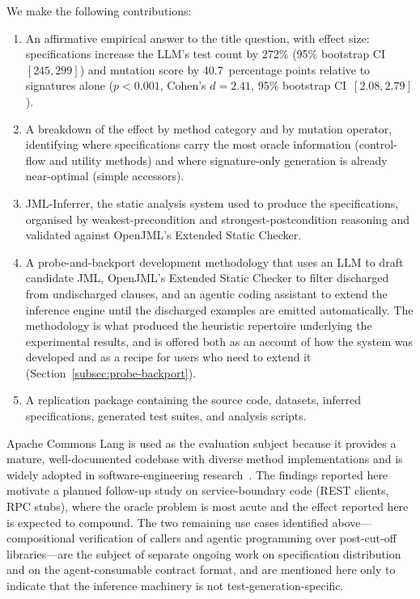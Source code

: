We make the following contributions:

\begin{enumerate}
    \item An affirmative empirical answer to the title question, with effect size: specifications increase the LLM's test count by 272\% (95\% bootstrap CI~$[245, 299]$) and mutation score by 40.7~percentage points relative to signatures alone ($p < 0.001$, Cohen's $d = 2.41$, 95\% bootstrap CI~$[2.08, 2.79]$).

    \item A breakdown of the effect by method category and by mutation operator, identifying where specifications carry the most oracle information (control-flow and utility methods) and where signature-only generation is already near-optimal (simple accessors).

    \item JML-Inferrer, the static analysis system used to produce the specifications, organised by weakest-precondition and strongest-postcondition reasoning and validated against OpenJML's Extended Static Checker.

    \item A probe-and-backport development methodology that uses an LLM to draft candidate JML, OpenJML's Extended Static Checker to filter discharged from undischarged clauses, and an agentic coding assistant to extend the inference engine until the discharged examples are emitted automatically. The methodology is what produced the heuristic repertoire underlying the experimental results, and is offered both as an account of how the system was developed and as a recipe for users who need to extend it (Section~\ref{subsec:probe-backport}).

    \item A replication package containing the source code, datasets, inferred specifications, generated test suites, and analysis scripts.
\end{enumerate}

Apache Commons Lang is used as the evaluation subject because it provides a mature, well-documented codebase with diverse method implementations and is widely adopted in software-engineering research~\cite{pacheco2007randoop, fraser2011evosuite}. The findings reported here motivate a planned follow-up study on service-boundary code (REST clients, RPC stubs), where the oracle problem is most acute and the effect reported here is expected to compound. The two remaining use cases identified above---compositional verification of callers and agentic programming over post-cut-off libraries---are the subject of separate ongoing work on specification distribution and on the agent-consumable contract format, and are mentioned here only to indicate that the inference machinery is not test-generation-specific.
